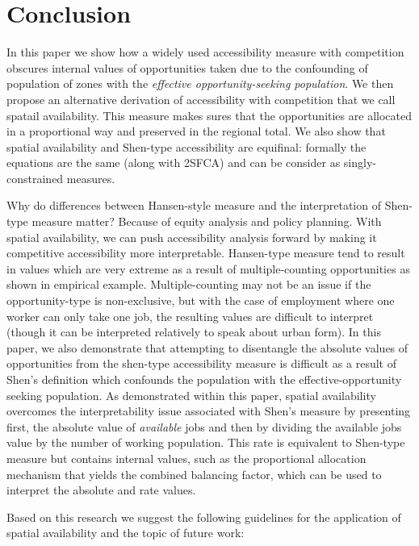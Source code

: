 \documentclass[]{elsarticle} %
\begin{document}
\newpage

\hypertarget{conclusion}{%
\section{Conclusion}\label{conclusion}}

In this paper we show how a widely used accessibility measure with
competition obscures internal values of opportunities taken due to the
confounding of population of zones with the \emph{effective
opportunity-seeking population}. We then propose an alternative
derivation of accessibility with competition that we call spatail
availability. This measure makes sures that the opportunities are
allocated in a proportional way and preserved in the regional total. We
also show that spatial availability and Shen-type accessibility are
equifinal: formally the equations are the same (along with 2SFCA) and
can be consider as singly-constrained measures.

Why do differences between Hansen-style measure and the interpretation
of Shen-type measure matter? Because of equity analysis and policy
planning. With spatial availability, we can push accessibility analysis
forward by making it competitive accessibility more interpretable.
Hansen-type measure tend to result in values which are very extreme as a
result of multiple-counting opportunities as shown in empirical example.
Multiple-counting may not be an issue if the opportunity-type is
non-exclusive, but with the case of employment where one worker can only
take one job, the resulting values are difficult to interpret (though it
can be interpreted relatively to speak about urban form). In this paper,
we also demonstrate that attempting to disentangle the absolute values
of opportunities from the shen-type accessibility measure is difficult
as a result of Shen's definition which confounds the population with the
effective-opportunity seeking population. As demonstrated within this
paper, spatial availability overcomes the interpretability issue
associated with Shen's measure by presenting first, the absolute value
of \emph{available} jobs and then by dividing the available jobs value
by the number of working population. This rate is equivalent to
Shen-type measure but contains internal values, such as the proportional
allocation mechanism that yields the combined balancing factor, which
can be used to interpret the absolute and rate values.

Based on this research we suggest the following guidelines for the
application of spatial availability and the topic of future work:
\end{document}
